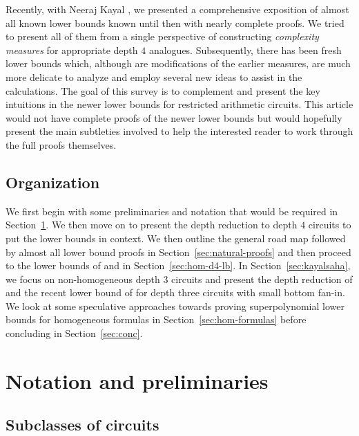 \documentclass{beatcs}
\begin{document}
Recently, with Neeraj Kayal  \cite{KayalRP}, we presented a comprehensive exposition of almost all known lower bounds known until then with nearly complete proofs. We tried to present all of them from a single perspective of constructing \emph{complexity measures} for appropriate depth $4$ analogues. Subsequently, there has been fresh lower bounds which, although are modifications of the earlier measures, are much more delicate to analyze and employ several new ideas to assist in the calculations. The goal of this survey is to complement \cite{KayalRP} and present the key intuitions in the newer lower bounds for restricted arithmetic circuits. This article would not have complete proofs of the newer lower bounds but would hopefully present the main subtleties involved to help the interested reader to work through the full proofs themselves. 

\subsection*{Organization}

We first begin with some preliminaries and notation that would be required in Section~\ref{sec:notation}. We then move on to present the depth reduction to depth $4$ circuits to put the lower bounds in context. We then outline the general road map followed by almost all lower bound proofs in Section~\ref{sec:natural-proofs} and then proceed to the lower bounds of \cite{KLSS} and \cite{KS14} in Section~\ref{sec:hom-d4-lb}. In Section~\ref{sec:kayalsaha}, we focus on non-homogeneous depth $3$ circuits and present the depth reduction of \cite{gkks13b} and the recent lower bound of \cite{KayalSaha14} for depth three circuits with small bottom fan-in. We look at some speculative approaches towards proving superpolynomial lower bounds for homogeneous formulas in Section~\ref{sec:hom-formulas} before concluding in Section~\ref{sec:conc}. 


\section{Notation and preliminaries}\label{sec:notation}

\subsection{Subclasses of circuits}
\end{document}
